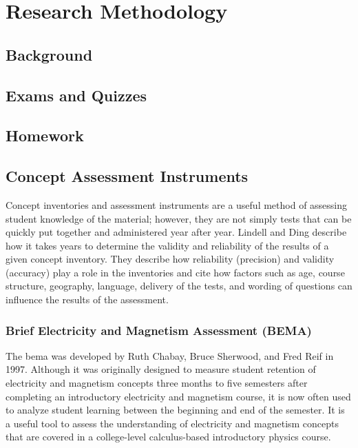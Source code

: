 \chapter[Chapter 3: Research Methodology]{Research Methodology}

\section{Background}

\section{Exams and Quizzes}

\section{Homework}

\section{Concept Assessment Instruments}

Concept inventories and assessment instruments are a useful method of assessing student knowledge of the material; however, they are not simply tests that can be quickly put together and administered year after year. Lindell and Ding describe how it takes years to determine the validity and reliability of the results of a given concept inventory. They describe how reliability (precision) and validity (accuracy) play a role in the inventories and cite how factors such as age, course structure, geography, language, delivery of the tests, and wording of questions can influence the results of the assessment\cite{lindell2012}.

\subsection{Brief Electricity and Magnetism Assessment (BEMA)}

The \gls{bema} was developed by Ruth Chabay, Bruce Sherwood, and Fred Reif in 1997. Although it was originally designed to measure student retention of electricity and magnetism concepts three months to five semesters after completing an introductory electricity and magnetism course, it is now often used to analyze student learning between the beginning and end of the semester. It is a useful tool to assess the understanding of electricity and magnetism concepts that are covered in a college-level calculus-based introductory physics course\cite{ding2006}.

